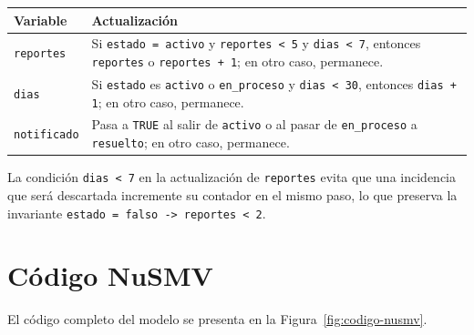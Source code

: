 \documentclass[11pt,a4paper]{article}
\begin{document}
\begin{center}
\begin{tabular}{|l|p{11cm}|}
\hline
\textbf{Variable} & \textbf{Actualización} \\
\hline
\texttt{reportes} & Si \texttt{estado = activo} y \texttt{reportes < 5} y \texttt{dias < 7}, entonces \texttt{reportes} o \texttt{reportes + 1}; en otro caso, permanece. \\
\hline
\texttt{dias} & Si \texttt{estado} es \texttt{activo} o \texttt{en\_proceso} y \texttt{dias < 30}, entonces \texttt{dias + 1}; en otro caso, permanece. \\
\hline
\texttt{notificado} & Pasa a \texttt{TRUE} al salir de \texttt{activo} o al pasar de \texttt{en\_proceso} a \texttt{resuelto}; en otro caso, permanece. \\
\hline
\end{tabular}
\end{center}

La condición \texttt{dias < 7} en la actualización de \texttt{reportes} evita que una incidencia que será descartada incremente su contador en el mismo paso, lo que preserva la invariante \texttt{estado = falso -> reportes < 2}.

\section{Código NuSMV}

El código completo del modelo se presenta en la Figura~\ref{fig:codigo-nusmv}.
\end{document}
